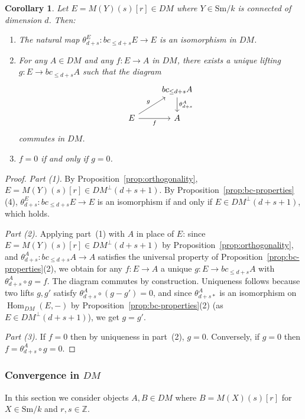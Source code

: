 \documentclass[12pt,a4paper]{article}
\newtheorem{corollary}[theorem]{Corollary}
\theoremstyle{definition}
\newcommand{\Sm}{\mathrm{Sm}}
\newcommand{\Hom}{\operatorname{Hom}}
\newcommand{\Z}{\mathbb{Z}}
\begin{document}
\begin{corollary}\label{cor:bc-isomorphism}
Let $E=M(Y)(s)[r]\in DM$ where $Y\in\Sm/k$ is connected of dimension $d$.  Then:
\begin{enumerate}
  \item The natural map $\theta_{d+s}^E:bc_{\leq d+s}E\to E$ is an isomorphism in
    $DM$.
  \item For any $A\in DM$ and any $f:E\to A$ in $DM$, there exists a unique lifting
    $g:E\to bc_{\leq d+s}A$ such that the diagram
    \[
    \begin{tikzcd}
      & bc_{\leq d+s}A \ar[d,"\theta_{d+s}^A"]\\
      E \ar[ur,"g"] \ar[r,"f"'] & A
    \end{tikzcd}
    \]
    commutes in $DM$.
  \item $f=0$ if and only if $g=0$.
\end{enumerate}
\end{corollary}
\begin{proof}
\textit{Part (1).}  By Proposition~\ref{prop:orthogonality},
$E=M(Y)(s)[r]\in DM^\perp(d+s+1)$.  By Proposition~\ref{prop:bc-properties}(4),
$\theta_{d+s}^E:bc_{\leq d+s}E\to E$ is an isomorphism if and only if
$E\in DM^\perp(d+s+1)$, which holds.

\textit{Part (2).}  Applying part~(1) with $A$ in place of $E$: since
$E=M(Y)(s)[r]\in DM^\perp(d+s+1)$ by Proposition~\ref{prop:orthogonality}, and
$\theta_{d+s}^A:bc_{\leq d+s}A\to A$ satisfies the universal property of
Proposition~\ref{prop:bc-properties}(2), we obtain for any $f:E\to A$ a unique
$g:E\to bc_{\leq d+s}A$ with $\theta_{d+s}^A\circ g = f$.  The diagram commutes
by construction.  Uniqueness follows because two lifts $g,g'$ satisfy
$\theta_{d+s}^A\circ(g-g')=0$, and since $\theta_{d+s*}^A$ is an isomorphism on
$\Hom_{DM}(E,-)$ by Proposition~\ref{prop:bc-properties}(2) (as $E\in DM^\perp(d+s+1)$),
we get $g=g'$.

\textit{Part (3).}  If $f=0$ then by uniqueness in part~(2), $g=0$.  Conversely,
if $g=0$ then $f=\theta_{d+s}^A\circ g=0$.
\end{proof}

\subsubsection{Convergence in $DM$}

In this section we consider objects $A,B\in DM$ where $B=M(X)(s)[r]$ for
$X\in\Sm/k$ and $r,s\in\Z$.
\end{document}

